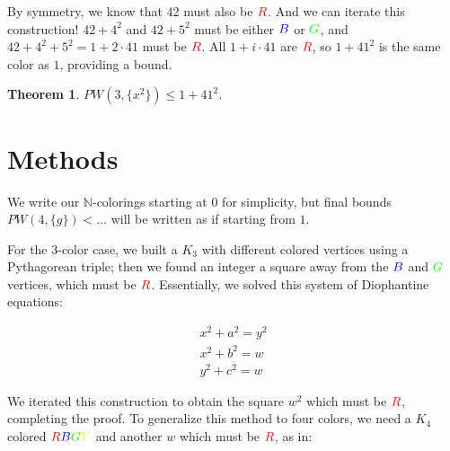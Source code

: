 \documentclass[a4paper]{amsproc}
\theoremstyle{plain}
\newtheorem{thm}{Theorem}[section]
\theoremstyle{named}
\newcommand{\RR} {\color{red} R}
\newcommand{\BB} {\color{blue} B}
\newcommand{\GG} {\color{green} G}
\newcommand{\YY} {\color{yellow} Y}
\newcommand{\N} {\mathbb{N}}
\begin{document}
By symmetry, we know that 42 must also be $\RR$.
And we can iterate this construction! $42+4^2$ and $42+5^2$ must be either $\BB$ or $\GG$, and $42+4^2+5^2=1+2\cdot41$ must be $\RR$.
All $1+i\cdot41$ are $\RR$, so $1+41^2$ is the same color as $1$, providing a bound.

\begin{thm}
  $PW(3, \{x^2\})\leq 1+41^2$.
\end{thm}

\section{Methods}

We write our $\N$-colorings starting at $0$ for simplicity, but final bounds \\${PW(4, \{g\}) < \ldots}$ will be written as if starting from $1$.

For the 3-color case, we built a $K_3$ with different colored vertices using a Pythagorean triple;
then we found an integer a square away from the $\BB$ and $\GG$ vertices, which must be $\RR$.
Essentially, we solved this system of Diophantine equations:

$$
\begin{matrix}
x^2 + a^2 = y^2 \\
x^2 + b^2 = w \\
y^2 + c^2 = w
\end{matrix}
$$

We iterated this construction to obtain the square $w^2$ which must be $\RR$, completing the proof.
To generalize this method to four colors, we need a $K_4$ colored $\RR\BB\GG\YY$ and another $w$ which must be $\RR$, as in:

\begin{figure}[H]
\caption{}
\label{fig:M4}
\end{figure}
\end{document}
